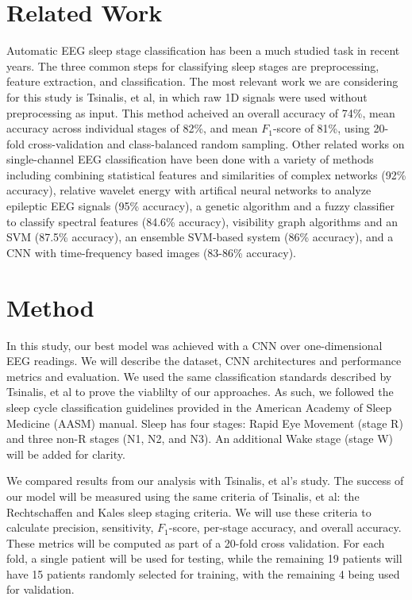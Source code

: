 \documentclass{amia}
\begin{document}
\section*{Related Work}
Automatic EEG sleep stage classification has been a much studied task in recent years. The three common steps for classifying sleep stages are preprocessing, feature extraction, and classification. The most relevant work we are considering for this study is Tsinalis, et al, in which raw 1D signals were used without preprocessing as input\cite{ref_Tsinalis2016}. This method acheived an overall accuracy of 74\%, mean accuracy across individual stages of 82\%, and mean $F_{1}$-score of 81\%, using 20-fold cross-validation and class-balanced random sampling. Other related works on single-channel EEG classification have been done with a variety of methods including combining statistical features and similarities of complex networks (92\% accuracy)\cite{ref_DiykhLi2016}, relative wavelet energy with artifical neural networks to analyze epileptic EEG signals (95\% accuracy)\cite{ref_Guo2009}, a genetic algorithm and a fuzzy classifier to classify spectral features (84.6\% accuracy)\cite{ref_Jo2010}, visibility graph algorithms and an SVM (87.5\% accuracy)\cite{ref_Liu2010}, an ensemble SVM-based system (86\% accuracy)\cite{ref_Koley2012}, and a CNN with time-frequency based images (83-86\% accuracy)\cite{ref_Vilamala2017}.

\section*{Method}
In this study, our best model was achieved with a CNN over one-dimensional EEG readings. We will describe the dataset, CNN architectures and performance metrics and evaluation. We used the same classification standards described by Tsinalis, et al to prove the viablilty of our approaches. As such, we followed the sleep cycle classification guidelines provided in the American Academy of Sleep Medicine (AASM) manual\cite{ref_Iber2007}. Sleep has four stages: Rapid Eye Movement (stage R) and three non-R stages (N1, N2, and N3). An additional Wake stage (stage W) will be added for clarity.

We compared results from our analysis with Tsinalis, et al's study. The success of our model will be measured using the same criteria of Tsinalis, et al: the Rechtschaffen and Kales sleep staging criteria\cite{ref_Rechtschaffen1968}. We will use these criteria to calculate precision, sensitivity, $F_{1}$-score, per-stage accuracy, and overall accuracy. These metrics will be computed as part of a 20-fold cross validation. For each fold, a single patient will be used for testing, while the remaining 19 patients will have 15 patients randomly selected for training, with the remaining 4 being used for validation.
\end{document}
